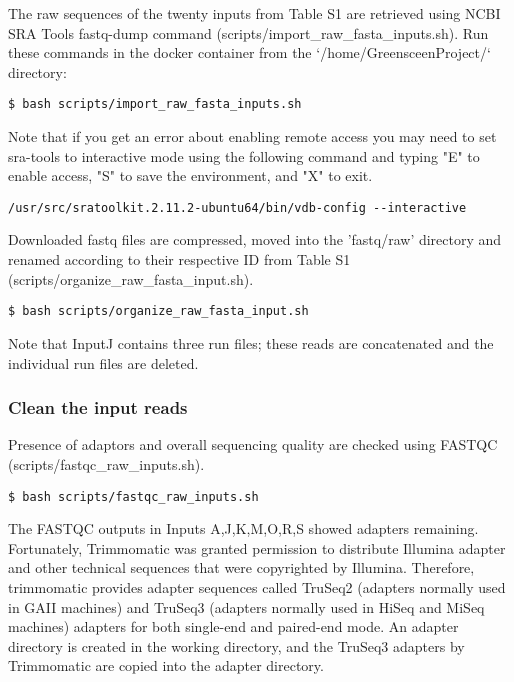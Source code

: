 \documentclass{article}
\begin{document}
\begin{sloppypar}
The raw sequences of the twenty inputs from Table S1 are retrieved using NCBI SRA Tools fastq-dump command ({\selectfont scripts/import\_raw\_fasta\_inputs.sh}). Run these commands in the docker container from the `/home/GreensceenProject/` directory:

\begin{verbatim}
$ bash scripts/import_raw_fasta_inputs.sh
\end{verbatim}

Note that if you get an error about enabling remote access you may need to set sra-tools to interactive mode using the following command and typing "E" to enable access, "S" to save the environment, and "X" to exit. 

\begin{verbatim}
/usr/src/sratoolkit.2.11.2-ubuntu64/bin/vdb-config --interactive
\end{verbatim}

Downloaded fastq files are compressed, moved into the 'fastq/raw' directory and renamed according to their respective ID from Table S1 ({\selectfont scripts/organize\_raw\_fasta\_input.sh}).

\begin{verbatim}
$ bash scripts/organize_raw_fasta_input.sh
\end{verbatim}

Note that InputJ contains three run files; these reads are concatenated and the individual run files are deleted.

\subsubsection{Clean the input reads}

Presence of adaptors and overall sequencing quality are checked using FASTQC ({\selectfont scripts/fastqc\_raw\_inputs.sh}). 

\begin{verbatim}
$ bash scripts/fastqc_raw_inputs.sh
\end{verbatim}

The FASTQC outputs in Inputs A,J,K,M,O,R,S showed adapters remaining. Fortunately, Trimmomatic was granted permission to distribute Illumina adapter and other technical sequences that were copyrighted by Illumina. Therefore, trimmomatic provides adapter sequences called TruSeq2 (adapters normally used in GAII machines) and TruSeq3 (adapters normally used in HiSeq and MiSeq machines) adapters for both single-end and paired-end mode. An adapter directory is created in the working directory, and the TruSeq3 adapters by Trimmomatic are copied into the adapter directory.


\end{sloppypar}
\end{document}
